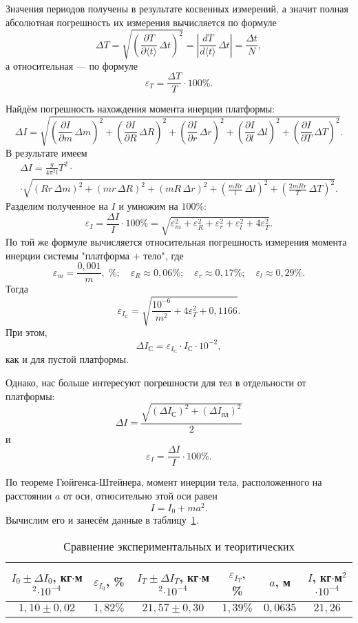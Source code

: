 Значения периодов получены в результате косвенных измерений, а значит полная абсолютная погрешность их измерения вычисляется по формуле
\[
\Delta T=\sqrt{\left(\frac{\partial T}{\partial\langle t\rangle}\,\Delta t\right)^2}=\left|\frac{dT}{d\langle t\rangle}\,\Delta t\right|=\frac{\Delta t}{N},
\]
а относительная --- по формуле
\[
\varepsilon_T=\frac{\Delta T}{T}\cdot100\%.
\]

Найдём погрешность нахождения момента инерции платформы:
\[
\Delta I=\sqrt{\left(\frac{\partial I}{\partial m}\,\Delta m\right)^2+\left(\frac{\partial I}{\partial R}\,\Delta R\right)^2+\left(\frac{\partial I}{\partial r}\,\Delta r\right)^2+\left(\frac{\partial I}{\partial l}\,\Delta l\right)^2+\left(\frac{\partial I}{\partial T}\,\Delta T\right)^2}.
\]
В результате имеем
\begin{multline*}
\Delta I=\frac{g}{4\pi^2l}T^2\cdot \\
\cdot\sqrt{\left(Rr\,\Delta m\right)^2+\left(mr\,\Delta R\right)^2+\left(mR\,\Delta r\right)^2+\left(\frac{mRr}{l}\,\Delta l\right)^2+\left(\frac{2mRr}{T}\,\Delta T\right)^2}.
\end{multline*}
Разделим полученное на $I$ и умножим на $100\%$:
\[
\varepsilon_I=\frac{\Delta I}{I}\cdot100\%=\sqrt{\varepsilon_m^2+\varepsilon_R^2+\varepsilon_r^2+\varepsilon_l^2+4\varepsilon^2_T}.
\]
По той же формуле вычисляется относительная погрешность измерения момента инерции системы "платформа $+$ тело"{}, где
\[
\varepsilon_m=\frac{0{,}001}{m},\;\%;\quad \varepsilon_R\approx0{,}06\%;\quad\varepsilon_r\approx0{,}17\%;\quad\varepsilon_l\approx0{,}29\%.
\]
Тогда
\[
\varepsilon_{I_\text{С}}=\sqrt{\frac{10^{-6}}{m^2}+4\varepsilon^2_T+0{,}1166}.
\]
При этом,
\[
\Delta I_\text{С}=\varepsilon_{I_\text{С}}\cdot I_\text{С}\cdot10^{-2},
\]
как и для пустой платформы. 

Однако, нас больше интересуют погрешности для тел в отдельности от платформы:
\[
\Delta I=\frac{\sqrt{(\Delta I_\text{С})^2+(\Delta I_\text{пл})^2}}{2}
\]
и
\[
\varepsilon_I=\frac{\Delta I}{I}\cdot 100\%.
\]

По теореме Гюйгенса-Штейнера, момент инерции тела, расположенного на расстоянии $a$ от оси, относительно этой оси равен
\[
I=I_0+ma^2.
\]
Вычислим его и занесём данные в таблицу~\ref{TbTwo}.

\begin{table}[h]
	\begin{center}
	\begin{tabular}{|c|c|c|c|c|c|}
		\hline
		\parbox[c][3.5em]{5em}{$I_0\pm\Delta I_0$, кг$\cdot$м$^2$$\cdot$$10^{-4}$} & $\varepsilon_{I_0}$, \% & \parbox[c][3.5em]{5em}{$I_T\pm\Delta I_T$, кг$\cdot$м$^2$$\cdot$$10^{-4}$} & $\varepsilon_{I_T}$, \% & $a$, м & \parbox[c][3.5em]{5em}{$I$, кг$\cdot$м$^2$$\cdot$$10^{-4}$} \\
		\hline
		\hline
		$1{,}10\pm0{,}02$ & $1{,}82\%$ & $21{,}57\pm0{,}30$ & $1{,}39\%$ & $0{,}0635$ & $21{,}26$ \\
		\hline
	\end{tabular}
	\caption{Сравнение экспериментальных и теоритических}\label{TbTwo}
	\end{center}
\end{table}
